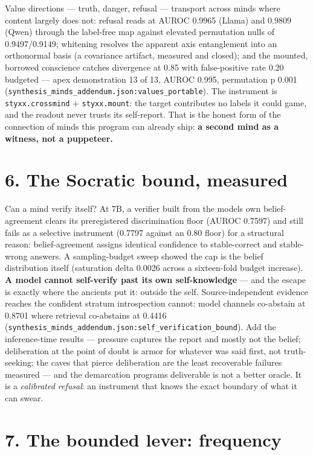 \documentclass[11pt]{article}
\begin{document}
Value directions --- truth, danger, refusal --- transport across minds where content largely does not: refusal reads at AUROC 0.9965 (Llama) and 0.9809 (Qwen) through the label-free map against elevated permutation nulls of 0.9497/0.9149; whitening resolves the apparent axis entanglement into an orthonormal basis (a covariance artifact, measured and closed); and the mounted, borrowed conscience catches divergence at 0.85 with false-positive rate 0.20 budgeted --- apex demonstration 13 of 13, AUROC 0.995, permutation p 0.001 (\texttt{synthesis\_minds\_addendum.json:values\_portable}). The instrument is \texttt{styxx.crossmind} + \texttt{styxx.mount}: the target contributes no labels it could game, and the readout never trusts its self-report. That is the honest form of the connection of minds this program can already ship: \textbf{a second mind as a witness, not a puppeteer.}

\section{6. The Socratic bound, measured}\label{6-the-socratic-bound-measured}

Can a mind verify itself? At 7B, a verifier built from the model\textquotesingle s own belief-agreement clears its preregistered discrimination floor (AUROC 0.7597) and still fails as a selective instrument (0.7797 against an 0.80 floor) for a structural reason: belief-agreement assigns identical confidence to stable-correct and stable-wrong answers. A sampling-budget sweep showed the cap is the belief distribution itself (saturation delta 0.0026 across a sixteen-fold budget increase). \textbf{A model cannot self-verify past its own self-knowledge} --- and the escape is exactly where the ancients put it: outside the self. Source-independent evidence reaches the confident stratum introspection cannot: model channels co-abstain at 0.8701 where retrieval co-abstains at 0.4416 (\texttt{synthesis\_minds\_addendum.json:self\_verification\_bound}). Add the inference-time results --- pressure captures the report and mostly not the belief; deliberation at the point of doubt is armor for whatever was said first, not truth-seeking; the caves that pierce deliberation are the least recoverable failures measured --- and the demarcation program\textquotesingle s deliverable is not a better oracle. It is a \emph{calibrated refusal}: an instrument that knows the exact boundary of what it can swear.

\section{7. The bounded lever: frequency}\label{7-the-bounded-lever-frequency}
\end{document}
